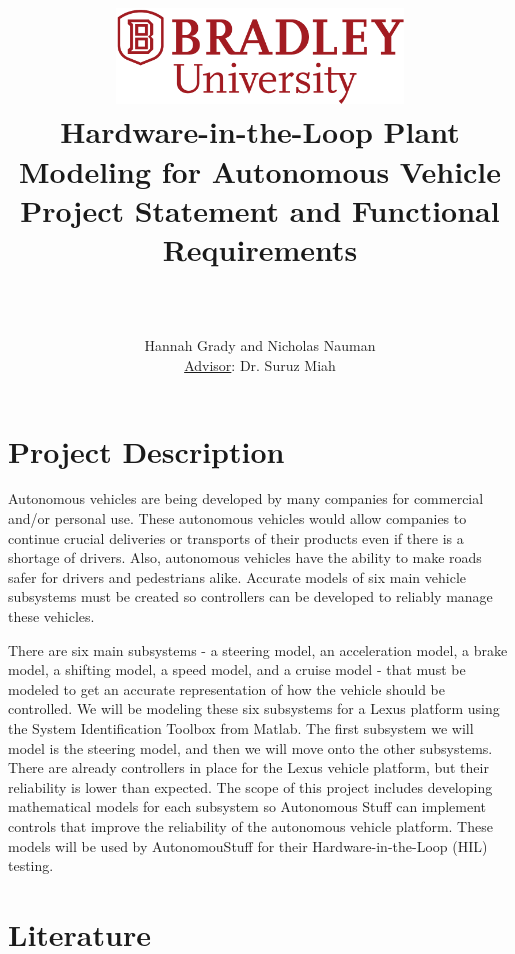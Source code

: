 \documentclass[12pt]{article} %
\title{
    \begin{center}
        \href{http://www.bradley.edu}{\includegraphics[height=1in]{figs/logoBU1-Print}}
        \vskip10pt
        \HRule \\[0.4cm]
        {\Huge \bfseries Hardware-in-the-Loop Plant Modeling for Autonomous Vehicle \\\Large Project Statement and Functional Requirements}\\[0.4cm] %
        \HRule \\[0.4cm]
    \end{center}
    }
\author{Hannah Grady and Nicholas Nauman \\ \underline{Advisor}: Dr. Suruz Miah}
\begin{document}
\maketitle

\newpage %

\section{Project Description}
Autonomous vehicles are being developed by many companies for commercial and/or personal use. These autonomous vehicles would allow companies to continue crucial deliveries or transports of their products even if there is a shortage of drivers. Also, autonomous vehicles have the ability to make roads safer for drivers and pedestrians alike. Accurate models of six main vehicle subsystems must be created so controllers can be developed to reliably manage these vehicles.

There are six main subsystems - a steering model, an acceleration model, a brake
model, a shifting model, a speed model, and a cruise model - that must be
modeled to get an accurate representation of how the vehicle should be
controlled. We will be modeling these six subsystems for a Lexus platform using
the System Identification Toolbox from Matlab. The first subsystem we will model is the steering model, and then we will move onto the other subsystems. There are already controllers in place for the Lexus vehicle platform, but their reliability is lower than expected. The scope of this project includes developing mathematical models for each subsystem so Autonomous Stuff can implement controls that improve the reliability of the autonomous vehicle platform. These models will be used by AutonomouStuff for their Hardware-in-the-Loop (HIL) testing. 


\section{Literature}
\label{sec:Literature}
\end{document}
